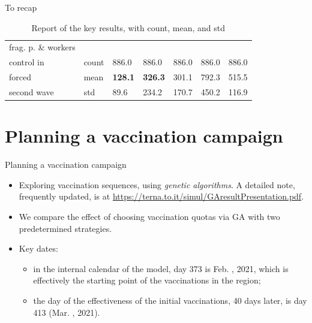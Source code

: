 \documentclass[8pt]{beamer}
\begin{document}
\begin{frame}{To recap}
\begin{table}[H]
\begin{tabular}{p{1.8cm}p{0.5cm}p{0.5cm}p{0.5cm}p{0.5cm}p{0.5cm}p{0.5cm}}
\midrule
frag. p. \& workers \\  
control in              & count &   886.0 &                      886.0 &              886.0 &                   886.0 &  886.0 \\
forced                  & mean  &  \textbf{{\color{cyan}128.1}} &         \textbf{{\color{cyan}326.3}} &          301.1 &        792.3 &  515.5 \\
second wave       & std   &  89.6 &        234.2 &   170.7 &          450.2 &  116.9 \\


\bottomrule
\end{tabular}
\caption{Report of the key results, with count, mean, and std}
\label{keyResultsT}
\end{table}



\end{frame}

\section{Planning a vaccination campaign}

\begin{frame}{Planning a vaccination campaign}

\begin{itemize}
\item Exploring vaccination sequences, using \emph{genetic algorithms}. A detailed note, frequently updated, is at \url{https://terna.to.it/simul/GAresultPresentation.pdf}.

\bigskip

\item We compare the effect of choosing vaccination quotas via GA with two predetermined strategies.

\bigskip

\item Key dates: 
\begin{itemize}
\item in the internal calendar of the model, day 373 is Feb. , 2021, which is effectively the starting point of the vaccinations in the region; 

\item the day of the effectiveness of the initial vaccinations, 40 days later, is day 413 (Mar. , 2021).
\end{itemize}

\end{itemize}

\end{frame}
\end{document}
